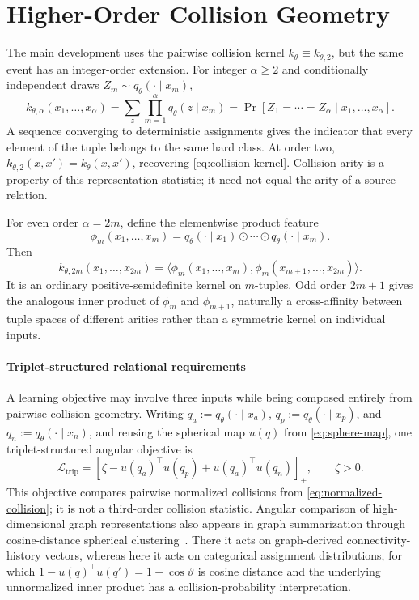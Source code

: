 \section{Higher-Order Collision Geometry}
\label{app:higher-order-collision-geometry}

The main development uses the pairwise collision kernel $k_\theta\equiv k_{\theta,2}$, but the same event has an integer-order extension.
For integer $\alpha\ge2$ and conditionally independent draws $Z_m\sim q_\theta(\cdot\mid x_m)$,
\begin{equation}
k_{\theta,\alpha}(x_1,\ldots,x_\alpha)
=\sum_z\prod_{m=1}^{\alpha}q_\theta(z\mid x_m)
=\Pr[Z_1=\cdots=Z_\alpha\mid x_1,\ldots,x_\alpha].
\label{eq:higher-order-collision}
\end{equation}
A sequence converging to deterministic assignments gives the indicator that every element of the tuple belongs to the same hard class.
At order two, $k_{\theta,2}(x,x')=k_\theta(x,x')$, recovering \cref{eq:collision-kernel}.
Collision arity is a property of this representation statistic; it need not equal the arity of a source relation.

For even order $\alpha=2m$, define the elementwise product feature
\begin{equation}
\phi_m(x_1,\ldots,x_m)
=q_\theta(\cdot\mid x_1)\odot\cdots\odot q_\theta(\cdot\mid x_m).
\end{equation}
Then
\begin{equation}
k_{\theta,2m}(x_1,\ldots,x_{2m})
=\langle\phi_m(x_1,\ldots,x_m),\phi_m(x_{m+1},\ldots,x_{2m})\rangle.
\label{eq:even-order-kernel}
\end{equation}
It is an ordinary positive-semidefinite kernel on $m$-tuples.
Odd order $2m+1$ gives the analogous inner product of $\phi_m$ and $\phi_{m+1}$, naturally a cross-affinity between tuple spaces of different arities rather than a symmetric kernel on individual inputs.

\paragraph{Triplet-structured relational requirements}
A learning objective may involve three inputs while being composed entirely from pairwise collision geometry.
Writing $q_a:=q_\theta(\cdot\mid x_a)$, $q_p:=q_\theta(\cdot\mid x_p)$, and $q_n:=q_\theta(\cdot\mid x_n)$, and reusing the spherical map $u(q)$ from \cref{eq:sphere-map}, one triplet-structured angular objective is
\begin{equation}
\mathcal L_{\mathrm{trip}}
=
\left[
\zeta-u(q_a)^\top u(q_p)+u(q_a)^\top u(q_n)
\right]_+,
\qquad \zeta>0.
\end{equation}
This objective compares pairwise normalized collisions from \cref{eq:normalized-collision}; it is not a third-order collision statistic.
Angular comparison of high-dimensional graph representations also appears in graph summarization through cosine-distance spherical clustering~\citep{tsalouchidou2020scalable}.
There it acts on graph-derived connectivity-history vectors, whereas here it acts on categorical assignment distributions, for which $1-u(q)^\top u(q')=1-\cos\vartheta$ is cosine distance and the underlying unnormalized inner product has a collision-probability interpretation.

